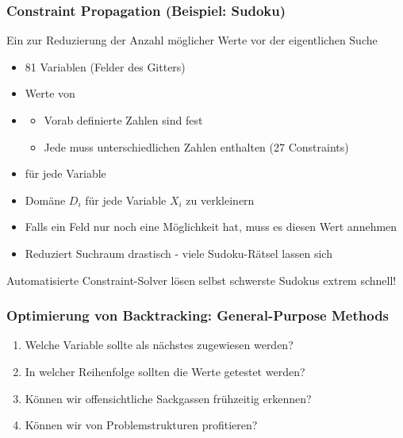 \subsubsection*{Constraint Propagation (Beispiel: Sudoku)}
Ein  zur Reduzierung der Anzahl möglicher Werte vor der eigentlichen Suche\\
\begin{itemize}
    \item 81 Variablen (Felder des Gitters)
    \item {} Werte von 
    \item {}
    \begin{itemize}
        \item Vorab definierte Zahlen sind fest
        \item Jede  muss unterschiedlichen Zahlen enthalten (27 Constraints)
    \end{itemize}
\end{itemize}
\begin{itemize}
    \item {} für jede Variable
    \item {} Domäne $D_{i}$ für jede Variable $X_{i}$ zu verkleinern
    \item {} Falls ein Feld nur noch eine Möglichkeit hat, muss es diesen Wert annehmen
    \item {} Reduziert Suchraum drastisch - viele Sudoku-Rätsel lassen sich 
\end{itemize}
 Automatisierte Constraint-Solver lösen selbst schwerste Sudokus extrem schnell!
\subsubsection*{Optimierung von Backtracking: General-Purpose Methods}
\begin{enumerate}
    \item Welche Variable sollte als nächstes zugewiesen werden?
    \item In welcher Reihenfolge sollten die Werte getestet werden?
    \item Können wir offensichtliche Sackgassen frühzeitig erkennen?
    \item Können wir von Problemstrukturen profitieren?
\end{enumerate}
